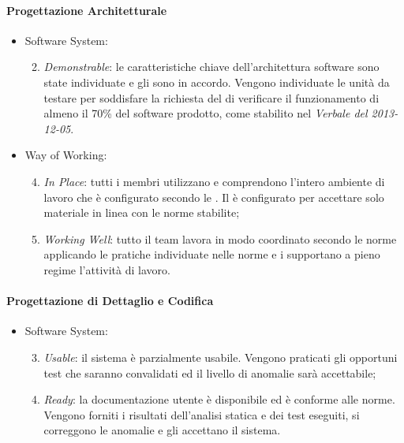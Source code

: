 	\paragraph{Progettazione Architetturale}	
		\begin{itemize}
    		\item Software System:
    			\begin{enumerate}
    			\setcounter{enumi}{1}
    				\item \emph{Demonstrable}: le caratteristiche chiave dell'architettura software sono state individuate e gli  sono in accordo. Vengono individuate le unità da testare per soddisfare la richiesta del  di verificare il funzionamento di almeno il 70\% del software prodotto, come stabilito nel \textit{Verbale del 2013-12-05}.
    			\end{enumerate}
    		\item Way of Working:
    			\begin{enumerate}
    			\setcounter{enumi}{3}
    				\item \emph{In Place}: tutti i membri utilizzano e comprendono l'intero ambiente di lavoro che è configurato secondo le \NormeDiProgetto. Il  è configurato per accettare solo materiale in linea con le norme stabilite;
    				\item \emph{Working Well}: tutto il team lavora in modo coordinato secondo le norme applicando le pratiche individuate nelle 	norme e i  supportano a pieno regime l'attività di lavoro.
    			\end{enumerate}
    			
    	\end{itemize}
    	
	\paragraph{Progettazione di Dettaglio e Codifica}	
		\begin{itemize}
    		\item Software System:
    			\begin{enumerate}
    			\setcounter{enumi}{2}
    				\item \emph{Usable}: il sistema è parzialmente usabile. Vengono praticati gli opportuni test che saranno convalidati ed il livello di anomalie sarà accettabile;
    				\item\emph{Ready}: la documentazione utente è disponibile ed è conforme alle norme. Vengono forniti i risultati dell'analisi statica e dei test eseguiti, si correggono le anomalie e gli  accettano il sistema.
    			\end{enumerate}
    	\end{itemize}
    	
